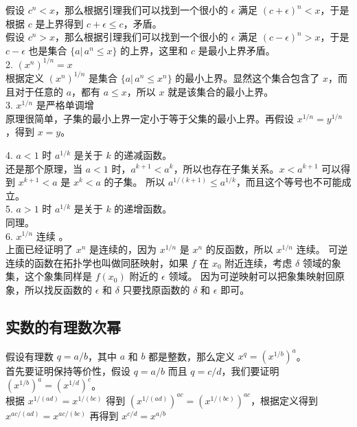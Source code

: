 假设 $c ^n < x$，那么根据引理我们可以找到一个很小的 $\epsilon$ 满足 $(c+\epsilon)^n < x$，于是根据 $c$ 是上界得到 $c + \epsilon \le c$，矛盾。 \\
假设 $c ^n > x$，那么根据引理我们可以找到一个很小的 $\epsilon$ 满足 $(c-\epsilon)^n > x$，于是 $c - \epsilon$ 也是集合 $\{ a \vert \, a^n \le x \}$ 的上界，这里和 $c$ 是最小上界矛盾。\\

2. $(x^n)^{1/n} = x$ \\

根据定义 $(x^n)^{1/n}$ 是集合 $\{a \vert \, a^n \le x^n \}$ 的最小上界。显然这个集合包含了 $x$，而且对于任意的 $a$，都有 $a \le x$，所以 $x$ 就是该集合的最小上界。\\

3. $x^{1/n}$ 是严格单调增 \\

原理很简单，子集的最小上界一定小于等于父集的最小上界。再假设 $x^{1/n} = y ^{1/n}$，得到 $x = y$。

4. $a < 1$ 时 $a^{1/k}$ 是关于 $k$ 的递减函数。\\
还是那个原理，当 $a < 1 $ 时，$a^{k+1} < a^{k} $，所以也存在子集关系。$x < a^{k+1} $ 可以得到 $ x^{k+1} < a$ 是 $x ^k < a$ 的子集。
所以 $a^{1/(k+1)} \le a^{1/k} $，而且这个等号也不可能成立。 \\

5. $a > 1$ 时 $a^{1/k}$ 是关于 $k$ 的递增函数。\\
同理。\\

6. $x ^{1/n}$ 连续 。\\
上面已经证明了 $ x^n$ 是连续的，因为 $ x ^{1/n}$ 是 $x^n$ 的反函数，所以 $x^{1/n}$ 连续。
可逆连续的函数在拓扑学也叫做同胚映射，如果 $f$ 在 $x_0$ 附近连续，考虑 $\delta$ 领域的象集，这个象集同样是 $f(x_0)$ 附近的 $\epsilon$ 领域。
因为可逆映射可以把象集映射回原象，所以找反函数的 $\epsilon$ 和 $\delta$ 只要找原函数的 $\delta$ 和 $\epsilon$ 即可。

\subsection{实数的有理数次幂}

假设有理数 $q = a/b $，其中 $a$ 和 $b$ 都是整数，那么定义 $x^q = (x^{1/b})^a $。 \\

首先要证明保持等价性，假设 $q = a/b$ 而且 $q = c/d$，我们要证明 $(x^{1/b})^a = (x^{1/d})^c$。\\
根据 $x^{1/(ad)} = x^{1/(bc)}$ 得到 $(x^{1/(ad)})^{ac} = (x^{1/(bc)})^{ac}$，根据定义得到 $x ^{ac/(ad)} = x^{ac/(bc)}$
再得到 $ x^{c/d} = x^{a/b}$

